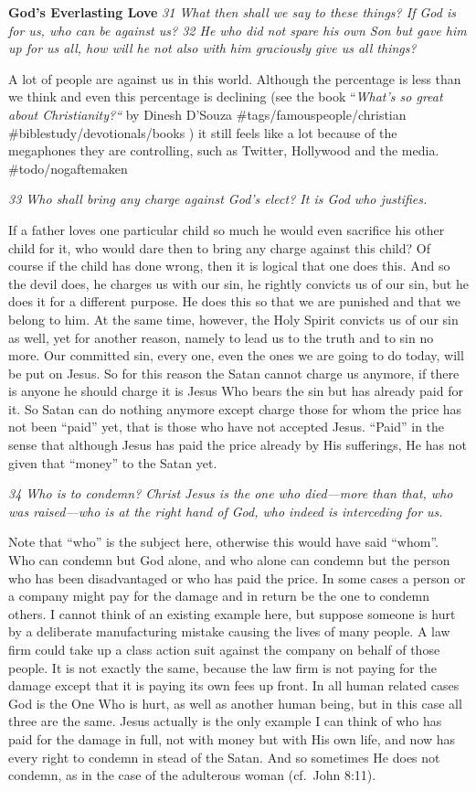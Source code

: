 \textbf{God's Everlasting Love} \emph{31 What then shall we say to these
things? If God is for us, who can be against us? 32 He who did not spare
his own Son but gave him up for us all, how will he not also with him
graciously give us all things?}

A lot of people are against us in this world. Although the percentage is
less than we think and even this percentage is declining (see the book
``\emph{What's so great about Christianity?{}``} by Dinesh D'Souza
\#tags/famouspeople/christian \#biblestudy/devotionals/books ) it still
feels like a lot because of the megaphones they are controlling, such as
Twitter, Hollywood and the media. \#todo/nogaftemaken

\emph{33 Who shall bring any charge against God's elect? It is God who
justifies.}

If a father loves one particular child so much he would even sacrifice
his other child for it, who would dare then to bring any charge against
this child? Of course if the child has done wrong, then it is logical
that one does this. And so the devil does, he charges us with our sin,
he rightly convicts us of our sin, but he does it for a different
purpose. He does this so that we are punished and that we belong to him.
At the same time, however, the Holy Spirit convicts us of our sin as
well, yet for another reason, namely to lead us to the truth and to sin
no more. Our committed sin, every one, even the ones we are going to do
today, will be put on Jesus. So for this reason the Satan cannot charge
us anymore, if there is anyone he should charge it is Jesus Who bears
the sin but has already paid for it. So Satan can do nothing anymore
except charge those for whom the price has not been ``paid'' yet, that
is those who have not accepted Jesus. ``Paid'' in the sense that
although Jesus has paid the price already by His sufferings, He has not
given that ``money'' to the Satan yet.

\emph{34 Who is to condemn? Christ Jesus is the one who died---more than
that, who was raised---who is at the right hand of God, who indeed is
interceding for us.}

Note that ``who'' is the subject here, otherwise this would have said
``whom''. Who can condemn but God alone, and who alone can condemn but
the person who has been disadvantaged or who has paid the price. In some
cases a person or a company might pay for the damage and in return be
the one to condemn others. I cannot think of an existing example here,
but suppose someone is hurt by a deliberate manufacturing mistake
causing the lives of many people. A law firm could take up a class
action suit against the company on behalf of those people. It is not
exactly the same, because the law firm is not paying for the damage
except that it is paying its own fees up front. In all human related
cases God is the One Who is hurt, as well as another human being, but in
this case all three are the same. Jesus actually is the only example I
can think of who has paid for the damage in full, not with money but
with His own life, and now has every right to condemn in stead of the
Satan. And so sometimes He does not condemn, as in the case of the
adulterous woman (cf.~John 8:11).

